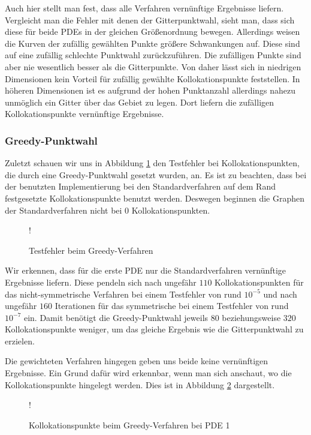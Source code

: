 Auch hier stellt man fest, dass alle Verfahren vernünftige Ergebnisse liefern. Vergleicht man die Fehler mit denen der Gitterpunktwahl, sieht man, dass sich diese für beide \acp{PDE} in der gleichen Größenordnung bewegen. Allerdings weisen die Kurven der zufällig gewählten Punkte größere Schwankungen auf. Diese sind auf eine zufällig schlechte Punktwahl zurückzuführen. Die zufälligen Punkte sind aber nie wesentlich besser als die Gitterpunkte. Von daher lässt sich in niedrigen Dimensionen kein Vorteil für zufällig gewählte Kollokationspunkte feststellen. In höheren Dimensionen ist es aufgrund der hohen Punktanzahl allerdings nahezu unmöglich ein Gitter über das Gebiet zu legen. Dort liefern die zufälligen Kollokationspunkte vernünftige Ergebnisse.

\subsubsection{Greedy-Punktwahl}
Zuletzt schauen wir uns in Abbildung \ref{fig:error-greedy} den Testfehler bei Kollokationspunkten, die durch eine Greedy-Punktwahl gesetzt wurden, an. Es ist zu beachten, dass bei der benutzten Implementierung bei den Standardverfahren auf dem Rand festgesetzte Kollokationspunkte benutzt werden. Deswegen beginnen die Graphen der Standardverfahren nicht bei $0$ Kollokationspunkten.
\begin{figure}[ht]
\centering
\resizebox {\columnwidth} {!} {

}
\caption{Testfehler beim Greedy-Verfahren}
\label{fig:error-greedy}
\end{figure}

Wir erkennen, dass für die erste \ac{PDE} nur die Standardverfahren vernünftige Ergebnisse liefern. Diese pendeln sich nach ungefähr $110$ Kollokationspunkten für das nicht-symmetrische Verfahren bei einem Testfehler von rund $10^{-5}$ und nach ungefähr $160$ Iterationen für das symmetrische bei einem Testfehler von rund $10^{-7}$ ein. Damit benötigt die Greedy-Punktwahl jeweils $80$ beziehungsweise $320$ Kollokationspunkte weniger, um das gleiche Ergebnis wie die Gitterpunktwahl zu erzielen.

Die gewichteten Verfahren hingegen geben uns beide keine vernünftigen Ergebnisse. Ein Grund dafür wird erkennbar, wenn man sich anschaut, wo die Kollokationspunkte hingelegt werden. Dies ist in Abbildung \ref{fig:greedy-points} dargestellt.
\begin{figure}[ht]
\centering
\resizebox {\columnwidth} {!} {

}
\caption{Kollokationspunkte beim Greedy-Verfahren bei \acs{PDE} 1}
\label{fig:greedy-points}
\end{figure}


